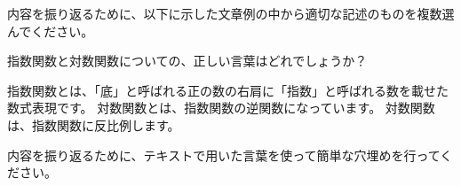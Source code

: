 \documentclass[uplatex,dvipdfmx,a4paper,11pt]{jsarticle}
\begin{document}
内容を振り返るために、以下に示した文章例の中から適切な記述のものを複数選んでください。
	\begin{qlist}
		\qitem 指数関数と対数関数についての、正しい言葉はどれでしょうか？
		\begin{qlist2}
			\qitem 指数関数とは、「底」と呼ばれる正の数の右肩に「指数」と呼ばれる数を載せた数式表現です。
			\qitem 対数関数とは、指数関数の逆関数になっています。
			\qitem 対数関数は、指数関数に反比例します。
			\qitem 
			\qitem 
		\end{qlist2}
    \vspace{3mm}
	\qitem 
		\begin{qlist2}
			\qitem 
			\qitem 
			\qitem 
			\qitem 
			\qitem 
		\end{qlist2}
    \vspace{3mm}
	\qitem 
		\begin{qlist2}
			\qitem 
			\qitem 
			\qitem 
			\qitem 
			\qitem 
		\end{qlist2}
    \vspace{3mm}
	\qitem 
	\begin{qlist2}
		\qitem 
		\qitem 
		\qitem 
		\qitem 
		\qitem 
	\end{qlist2}
  \vspace{3mm}
	\qitem 
	\begin{qlist2}
		\qitem 
		\qitem 
		\qitem 
		\qitem 
		\qitem 
	\end{qlist2}
\end{qlist}

内容を振り返るために、テキストで用いた言葉を使って簡単な穴埋めを行ってください。
\end{document}
